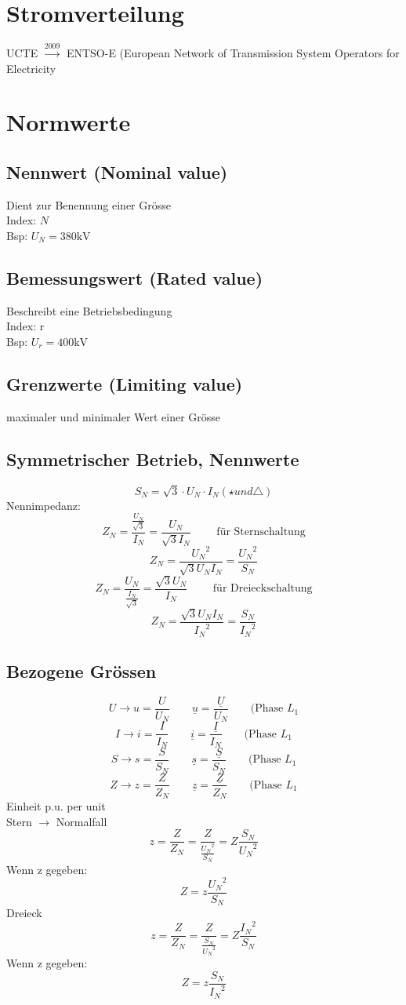 \documentclass[a4,paper,fleqn]{article}
\begin{document}
\section{Stromverteilung}
UCTE $\stackrel{2009}{\to}$ ENTSO-E (European Network of Transmission System Operators for Electricity

\section{Normwerte}
\subsection{Nennwert (Nominal value)}
Dient zur Benennung einer Grösse \\
Index: $N$ \\
Bsp: $U_N = 380 \si{\kilo\volt}$

\subsection{Bemessungswert (Rated value)}
Beschreibt eine Betriebsbedingung \\
Index: r \\
Bsp: $U_r = 400 \si{\kilo\volt}$

\subsection{Grenzwerte (Limiting value)}
maximaler und minimaler Wert einer Grösse

\subsection{Symmetrischer Betrieb, Nennwerte}
\[ S_N = \sqrt{3} \cdot U_N \cdot I_N (\star und \triangle) \]
Nennimpedanz: 
\[ Z_N = \frac{\frac{U_N}{\sqrt{3}}}{I_N} = \frac{U_N}{\sqrt{3} I_N} \qquad \text{ für Sternschaltung} \]
\[ Z_N = \frac{{U_N}^2}{\sqrt{3} U_N I_N} = \frac{{U_N}^2}{S_N} \]
\[ Z_N = \frac{U_N}{\frac{I_N}{\sqrt{3}}} = \frac{\sqrt{3} U_N}{I_N} \qquad \text{ für Dreieckschaltung} \]
\[ Z_N = \frac{\sqrt{3} U_N I_N}{{I_N}^2} = \frac{S_N}{{I_N}^2} \]

\subsection{Bezogene Grössen}
\[ U \to u = \frac{U}{U_N} \qquad \underline{u} = \frac{\underline{U}}{U_N} \qquad \text{(Phase $L_1$} \]
\[ I \to i = \frac{I}{I_N} \qquad \underline{i} = \frac{\underline{I}}{I_N} \qquad \text{(Phase $L_1$} \]
\[ S \to s = \frac{S}{S_N} \qquad \underline{s} = \frac{\underline{S}}{S_N} \qquad \text{(Phase $L_1$} \]
\[ Z \to z = \frac{Z}{Z_N} \qquad \underline{z} = \frac{\underline{Z}}{Z_N} \qquad \text{(Phase $L_1$} \]
Einheit p.u. per unit
\\
Stern $\to$ Normalfall
\[ z = \frac{Z}{Z_N} = \frac{Z}{\frac{{U_N}^2}{S_N}} = Z \frac{S_N}{{U_N}^2} \]
Wenn z gegeben: 
\[ \boxed{Z = z \frac{{U_N}^2}{S_N}} \]
Dreieck
\[ z = \frac{Z}{Z_N} = \frac{Z}{\frac{S_N}{{U_N}^2}} = Z \frac{{I_N}^2}{S_N} \]
Wenn z gegeben: 
\[ \boxed{Z = z \frac{S_N}{{I_N}^2}} \]
\end{document}
